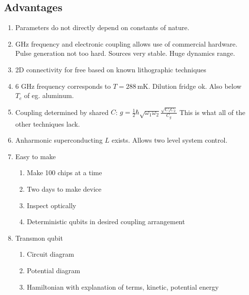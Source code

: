 \documentclass{report}
\begin{document}
\subsection{Advantages}
\begin{enumerate}
\item Parameters do not directly depend on constants of nature.
\item GHz frequency and electronic coupling allows use of commercial hardware. Pulse generation not too hard. Sources very stable. Huge dynamics range.
\item 2D connectivity for free based on known lithographic techniques
\item 6 GHz frequency corresponds to $T=288\,\textrm{mK}$. Dilution fridge ok. Also below $T_c$ of eg. aluminum.
\item Coupling determined by shared $C$: $g =\frac{1}{2}\hbar \sqrt{\omega_1 \omega_2} \frac{\sqrt{C_1 C_2}}{C_g}$ This is what all of the other techniques lack.
\item Anharmonic superconducting $L$ exists. Allows two level system control.
\item Easy to make
 \begin{enumerate}
 \item Make 100 chips at a time
 \item Two days to make device
 \item Inspect optically
 \item Deterministic qubits in desired coupling arrangement
 \end{enumerate}
\item Transmon qubit
 \begin{enumerate}
 \item Circuit diagram
 \item Potential diagram
 \item Hamiltonian with explanation of terms, kinetic, potential energy
 \end{enumerate}
\end{enumerate}
\end{document}
